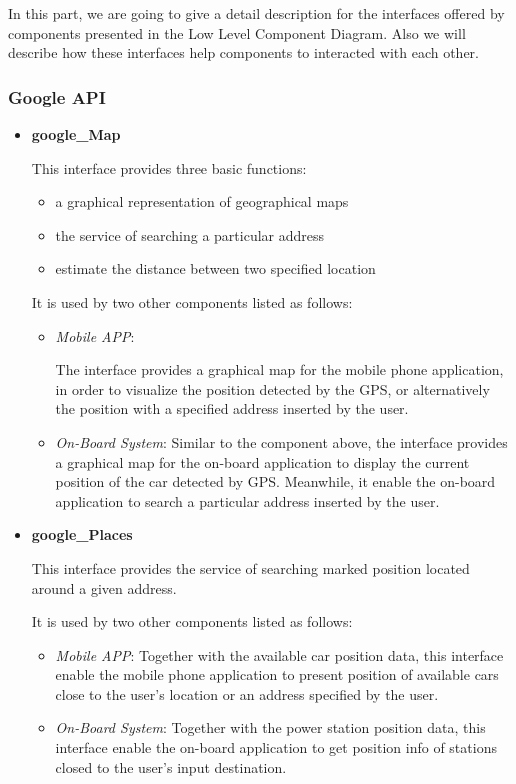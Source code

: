 \documentclass[a4paper,11pt]{article}
\begin{document}
In this part, we are going to give a detail description for the interfaces offered by components presented in the Low Level Component Diagram. Also we will describe how these interfaces help components to interacted with each other.
		\subsubsection{Google API}
			\begin{itemize}
				\item \textbf{google\_Map}

This interface provides three basic functions:
				\begin{itemize}
					\item a graphical representation of geographical maps
					\item the service of searching a particular address
					\item estimate the distance between two specified location 
				\end{itemize}

It is used by two other components listed as follows:
				\begin{itemize}
					\item \textsl{Mobile APP}: 
					
					The interface provides a graphical map for the mobile phone application, in order to visualize the position detected by the GPS, or alternatively the position with a specified address inserted by the user. 
					\item \textsl{On-Board System}: Similar to the component above, the interface provides a graphical map for the on-board application to display the current position of the car detected by GPS. Meanwhile, it enable the on-board application to search a particular address inserted by the user. 
				\end{itemize}
					
				\item \textbf{google\_Places}

This interface provides the service of searching marked position located around a given address. 

It is used by two other components listed as follows:
				\begin{itemize}
					\item \textsl{Mobile APP}: Together with the available car position data, this interface enable the mobile phone application to present position of available cars close to the user's location or an address specified by the user. 
					\item \textsl{On-Board System}: Together with the power station position data, this interface enable the on-board application to get position info of stations closed to the user's input destination. 
				\end{itemize}
 

\end{itemize}
\end{document}

